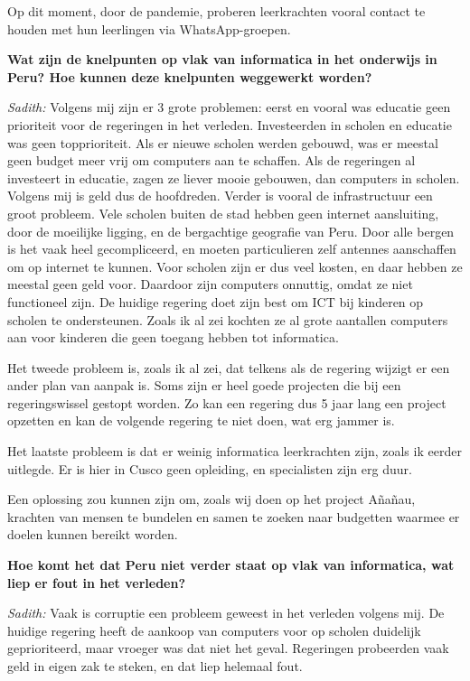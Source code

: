 Op dit moment, door de pandemie, proberen leerkrachten vooral contact te houden met hun leerlingen via WhatsApp-groepen.

\textbf{Wat zijn de knelpunten op vlak van informatica in het onderwijs in Peru? Hoe kunnen deze knelpunten weggewerkt worden?}

\textit{Sadith:} Volgens mij zijn er 3 grote problemen: eerst en vooral was educatie geen prioriteit voor de regeringen in het verleden. Investeerden in scholen en educatie was geen topprioriteit. Als er nieuwe scholen werden gebouwd, was er meestal geen budget meer vrij om computers aan te schaffen. Als de regeringen al investeert in educatie, zagen ze liever mooie gebouwen, dan computers in scholen. Volgens mij is geld dus de hoofdreden. Verder is vooral de infrastructuur een groot probleem. Vele scholen buiten de stad hebben geen internet aansluiting, door de moeilijke ligging, en de bergachtige geografie van Peru. Door alle bergen is het vaak heel gecompliceerd, en moeten particulieren zelf antennes aanschaffen om op internet te kunnen. Voor scholen zijn er dus veel kosten, en daar hebben ze meestal geen geld voor. Daardoor zijn computers onnuttig, omdat ze niet functioneel zijn. De huidige regering doet zijn best om ICT bij kinderen op scholen te ondersteunen. Zoals ik al zei kochten ze al grote aantallen computers aan voor kinderen die geen toegang hebben tot informatica.

Het tweede probleem is, zoals ik al zei, dat telkens als de regering wijzigt er een ander plan van aanpak is. Soms zijn er heel goede projecten die bij een regeringswissel gestopt worden. Zo kan een regering dus 5 jaar lang een project opzetten en kan de volgende regering te niet doen, wat erg jammer is. 

Het laatste probleem is dat er weinig informatica leerkrachten zijn, zoals ik eerder uitlegde. Er is hier in Cusco geen opleiding, en specialisten zijn erg duur.

Een oplossing zou kunnen zijn om, zoals wij doen op het project Añañau, krachten van mensen te bundelen en samen te zoeken naar budgetten waarmee er doelen kunnen bereikt worden. 

\textbf{Hoe komt het dat Peru niet verder staat op vlak van informatica, wat liep er fout in het verleden?}

\textit{Sadith:} Vaak is corruptie een probleem geweest in het verleden volgens mij. De huidige regering heeft de aankoop van computers voor op scholen duidelijk geprioriteerd, maar vroeger was dat niet het geval. Regeringen probeerden vaak geld in eigen zak te steken, en dat liep helemaal fout. 
 
